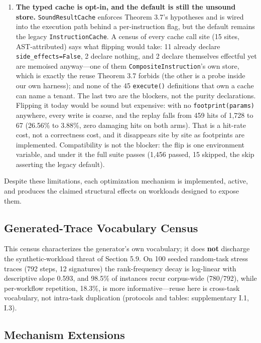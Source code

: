 \documentclass[
  sigconf,
  anonymous]{acmart}
\newcounter{none} %
\begin{document}
\begin{enumerate}
  there by construction, but the sensitivity is not quantified.
\item
  \textbf{The typed cache is opt-in, and the default is still the
  unsound store.} \texttt{SoundResultCache} enforces Theorem 3.7's
  hypotheses and is wired into the execution path behind a
  per-instruction flag, but the default remains the legacy
  \texttt{InstructionCache}. A census of every cache call site (15
  sites, AST-attributed) says what flipping would take: 11 already
  declare \texttt{side\_effects=False}, 2 declare nothing, and 2 declare
  themselves effectful yet are memoised anyway---one of them
  \texttt{CompositeInstruction}'s own store, which is exactly the reuse
  Theorem 3.7 forbids (the other is a probe inside our own harness); and
  none of the 45 \texttt{execute()} definitions that own a cache can
  name a tenant. The last two are the blockers, not the purity
  declarations. Flipping it today would be sound but expensive: with no
  \texttt{footprint(params)} anywhere, every write is coarse, and the
  replay falls from 459 hits of 1,728 to 67 (26.56\% to 3.88\%, zero
  damaging hits on both arms). That is a hit-rate cost, not a
  correctness cost, and it disappears site by site as footprints are
  implemented. Compatibility is not the blocker: the flip is one
  environment variable, and under it the full suite passes (1,456
  passed, 15 skipped, the skip asserting the legacy default).
\end{enumerate}

Despite these limitations, each optimization mechanism is implemented,
active, and produces the claimed structural effects on workloads
designed to expose them.

\subsection{Generated-Trace Vocabulary
Census}\label{generated-trace-vocabulary-census}

This census characterizes the generator's own vocabulary; it does
\textbf{not} discharge the synthetic-workload threat of Section 5.9. On
100 seeded random-task stress traces (792 steps, 12 signatures) the
rank-frequency decay is log-linear with descriptive slope 0.593, and
98.5\% of instances recur corpus-wide (780/792), while per-workflow
repetition, 18.3\%, is more informative---reuse here is cross-task
vocabulary, not intra-task duplication (protocols and tables:
supplementary I.1, I.3).

\subsection{Mechanism Extensions}\label{mechanism-extensions}
\end{document}
